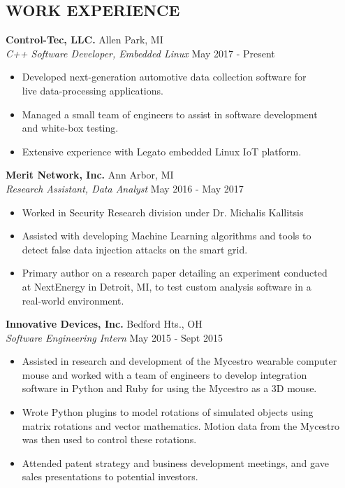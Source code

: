 \documentclass[margin,11pt]{res}
\begin{document}
\begin{resume}
\section{WORK EXPERIENCE}
\textbf{Control-Tec, LLC.} \hfill Allen Park, MI\\
\textsl{C++ Software Developer, Embedded Linux} \hfill May 2017 - Present
\begin{itemize}
	\itemsep -2pt
    \item Developed next-generation automotive data collection software for\\
          live data-processing applications.
    \item Managed a small team of engineers to assist in software development\\
          and white-box testing.
    \item Extensive experience with Legato embedded Linux IoT platform.
\end{itemize}

\textbf{Merit Network, Inc.} \hfill Ann Arbor, MI\\
\textsl{Research Assistant, Data Analyst} \hfill May 2016 - May 2017
\begin{itemize}
	\itemsep -2pt
	\item Worked in Security Research division under Dr. Michalis Kallitsis
    \item Assisted with developing Machine Learning algorithms and tools to\\
          detect false data injection attacks on the smart grid.
    \item Primary author on a research paper detailing an experiment conducted\\
          at NextEnergy in Detroit, MI, to test custom analysis software in a\\
          real-world environment.
\end{itemize}

\vspace{-10pt}
\textbf{Innovative Devices, Inc.} \hfill Bedford Hts., OH\\
\textsl{Software Engineering Intern} \hfill May 2015 - Sept 2015
\begin{itemize}
	\itemsep -2pt
    \item Assisted in research and development of the Mycestro wearable computer\\
          mouse and worked with a team of engineers to develop integration\\
          software in Python and Ruby for using the Mycestro as a 3D mouse.
    \item Wrote Python plugins to model rotations of simulated objects using\\
          matrix rotations and vector mathematics. Motion data from the Mycestro\\
          was then used to control these rotations.
    \item Attended patent strategy and business development meetings, and gave\\
          sales presentations to potential investors.
\end{itemize}


\end{resume}
\end{document}

